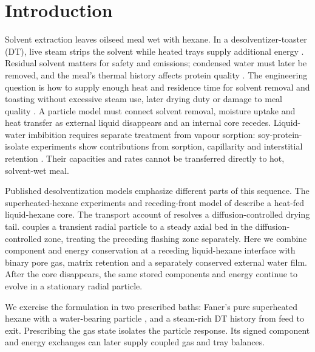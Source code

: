 \section{Introduction}\label{sec:intro}
Solvent extraction leaves oilseed meal wet with hexane. In a
desolventizer-toaster (DT), live steam strips the solvent while heated trays
supply additional energy \citep{sipos1961dt,witte_nd_soybeanmeal,karnofsky1985recovering}.
Residual solvent matters for safety and emissions; condensed water must
later be removed, and the meal's thermal history affects protein
quality \citep{epa1995ap42,kemper2013solvent,mustakas1981critical}.
The engineering question is how to supply enough heat and residence time
for solvent removal and toasting without excessive steam use, later
drying duty or damage to meal quality \citep{kemper2013solvent,witte_nd_soybeanmeal}.
A particle model must connect solvent removal, moisture uptake and heat
transfer as external liquid disappears and an internal core recedes.
Liquid-water imbibition requires separate treatment from vapour sorption:
soy-protein-isolate experiments show contributions from sorption, capillarity
and interstitial retention \citep{jovanovich2003wateruptake}. Their capacities
and rates cannot be transferred directly to hot, solvent-wet meal.

Published desolventization models emphasize different parts of this
sequence. The superheated-hexane experiments and receding-front model of
\citet{faner2019kinetics} describe a heat-fed liquid-hexane core. The transport
account of \citet{cardarelli2002modeling} resolves a diffusion-controlled
drying tail. \citet{coletto2022modeling} couples a transient radial particle
to a steady axial bed in the diffusion-controlled zone, treating the
preceding flashing zone separately. Here we combine component and energy
conservation at a receding liquid-hexane interface with binary pore gas,
matrix retention and a separately conserved external water film.
After the core disappears, the same stored components and energy continue
to evolve in a stationary radial particle.

We exercise the formulation in two prescribed baths: Faner's pure
superheated hexane with a water-bearing particle \citep{faner2019kinetics},
and a steam-rich DT history from feed to exit. Prescribing the gas state
isolates the particle response. Its signed component and energy exchanges
can later supply coupled gas and tray balances.

